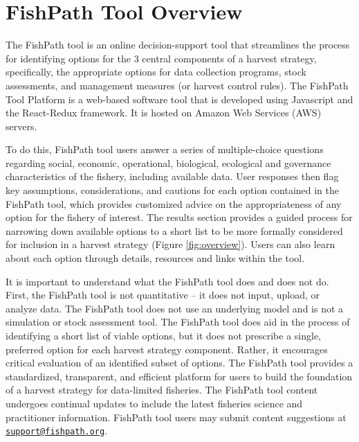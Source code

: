 \documentclass[
  11pt,
]{book}
\begin{document}
\hypertarget{fishpath-tool-overview}{%
\section{FishPath Tool Overview}\label{fishpath-tool-overview}}

The FishPath tool is an online decision-support tool that streamlines the process for identifying options for the 3 central components of a harvest strategy, specifically, the appropriate options for data collection programs, stock assessments, and management measures (or harvest control rules). The FishPath Tool Platform is a web-based software tool that is developed using Javascript and the React-Redux framework. It is hosted on Amazon Web Services (AWS) servers.

To do this, FishPath tool users answer a series of multiple-choice questions regarding social, economic, operational, biological, ecological and governance characteristics of the fishery, including available data. User responses then flag key assumptions, considerations, and cautions for each option contained in the FishPath tool, which provides customized advice on the appropriateness of any option for the fishery of interest. The results section provides a guided process for narrowing down available options to a short list to be more formally considered for inclusion in a harvest strategy (Figure \ref{fig:overview}). Users can also learn about each option through details, resources and links within the tool.

It is important to understand what the FishPath tool does and does not do. First, the FishPath tool is not quantitative -- it does not input, upload, or analyze data. The FishPath tool does not use an underlying model and is not a simulation or stock assessment tool. The FishPath tool does aid in the process of identifying a short list of viable options, but it does not prescribe a single, preferred option for each harvest strategy component. Rather, it encourages critical evaluation of an identified subset of options. The FishPath tool provides a standardized, transparent, and efficient platform for users to build the foundation of a harvest strategy for data-limited fisheries. The FishPath tool content undergoes continual updates to include the latest fisheries science and practitioner information. FishPath tool users may submit content suggestions at \href{mailto:support@fishpath.org}{\nolinkurl{support@fishpath.org}}.
\end{document}
